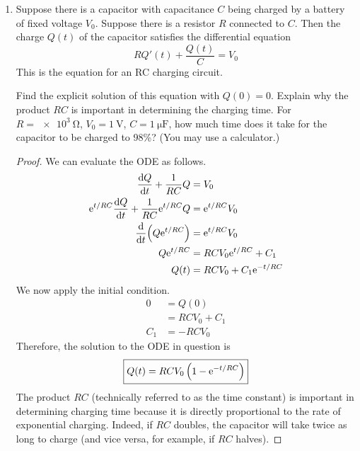 \documentclass[../psets.tex]{subfiles}
\begin{document}
\begin{enumerate}
    consider the transformation $w(\tau)=y(\e[\tau])$. What is the differential equation satisfied by $w(\tau)$? Use this transformation to solve
    \begin{equation*}
        2t^2y''+3ty'-15y=0
        ,\quad
        y(1) = 0
        ,\quad
        y'(1) = 1
    \end{equation*}
    \begin{proof}
        The differential equation satisfied by $w(\tau)$ is
    \end{proof}
    \item Suppose there is a capacitor with capacitance $C$ being charged by a battery of fixed voltage $V_0$. Suppose there is a resistor $R$ connected to $C$. Then the charge $Q(t)$ of the capacitor satisfies the differential equation
    \begin{equation*}
        RQ'(t)+\frac{Q(t)}{C} = V_0
    \end{equation*}
    This is the equation for an RC charging circuit.\par
    Find the explicit solution of this equation with $Q(0)=0$. Explain why the product $RC$ is important in determining the charging time. For $R=\SI{e3}{\ohm}$, $V_0=\SI{1}{\volt}$, $C=\SI{1}{\micro\farad}$, how much time does it take for the capacitor to be charged to 98\%? (You may use a calculator.)
    \begin{proof}
        We can evaluate the ODE as follows.
        \begin{align*}
            \dv{Q}{t}+\frac{1}{RC}Q &= V_0\\
            \e[t/RC]\dv{Q}{t}+\frac{1}{RC}\e[t/RC]Q &= \e[t/RC]V_0\\
            \dv{t}(Q\e[t/RC]) &= \e[t/RC]V_0\\
            Q\e[t/RC] &= RCV_0\e[t/RC]+C_1\\
            Q(t) &= RCV_0+C_1\e[-t/RC]
        \end{align*}
        We now apply the initial condition.
        \begin{align*}
            0 &= Q(0)\\
            &= RCV_0+C_1\\
            C_1 &= -RCV_0
        \end{align*}
        Therefore, the solution to the ODE in question is
        \begin{equation*}
            \boxed{Q(t) = RCV_0\left( 1-\e[-t/RC] \right)}
        \end{equation*}
        The product $RC$ (technically referred to as the time constant) is important in determining charging time because it is directly proportional to the rate of exponential charging. Indeed, if $RC$ doubles, the capacitor will take twice as long to charge (and vice versa, for example, if $RC$ halves).\par

\end{proof}
\end{enumerate}
\end{document}
